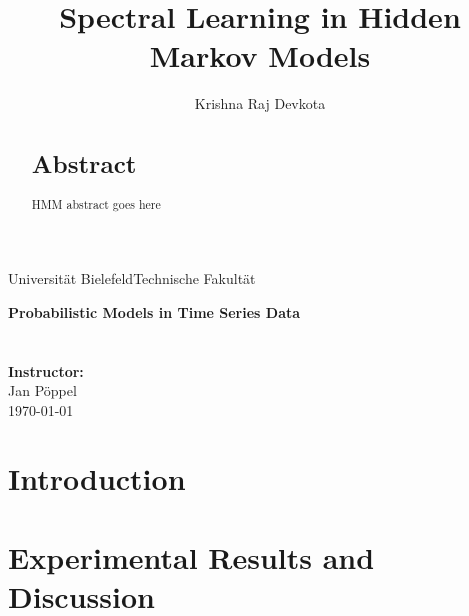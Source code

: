 \documentclass[a4paper]{article}
\title{Spectral Learning in Hidden Markov Models}
\author{Krishna Raj Devkota}
\begin{document}
\pagestyle{empty}
\begin{titlepage}
\makeatletter
	Universität Bielefeld\hfill Technische Fakultät\\[2cm]
	\begin{center}
		\textbf{\Large Probabilistic Models in Time Series Data}\\[1.5cm]
		\textbf{\huge \@title }\\[1.5cm]
		\Large \@author \\[2cm]
		\Large \textbf{Instructor:}\\
		\Large Jan Pöppel\\[2cm]
		\Large\today
	\end{center}
\makeatother
\end{titlepage}

\newpage

\begin{abstract}
\section*{Abstract}

HMM abstract goes here

\end{abstract}
\newpage

{\hypersetup{linkcolor=black}
\tableofcontents}

\newpage

\section{Introduction}



\section{Experimental Results and Discussion}


\newpage 

%



\end{document}
